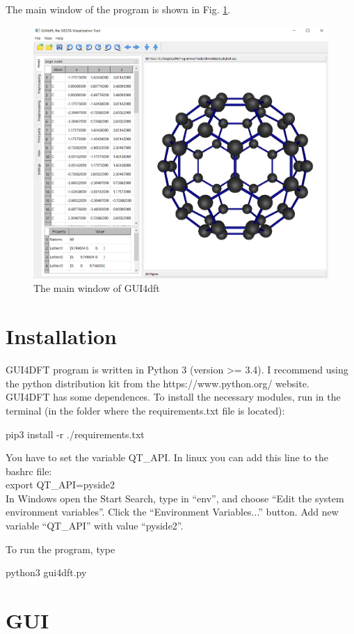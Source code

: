 \documentclass{article}
\begin{document}
The main window of the program is shown in Fig. \ref{fig:mainwindow}.

\begin{figure}[h!]
	\centering
	\includegraphics[width=5.0in]{mainwindow}
	\caption{The main window of GUI4dft}
	\label{fig:mainwindow}
\end{figure}

\section{Installation}

GUI4DFT program is written in Python 3 (version >= 3.4). I recommend using the python distribution kit from the https://www.python.org/ website. GUI4DFT has some dependences. To install the necessary modules, run in the terminal (in the folder where the requirements.txt file is located):

pip3 install -r ./requirements.txt

You have to set the variable QT\_API. In linux you can add this line to the bashrc file:\\
export QT\_API=pyside2 \\
In Windows open the Start Search, type in “env”, and choose “Edit the system environment variables”. Click the “Environment Variables...” button. Add new variable “QT\_API” with value “pyside2”. 

To run the program, type

python3 gui4dft.py
	
\section{GUI}
\end{document}

